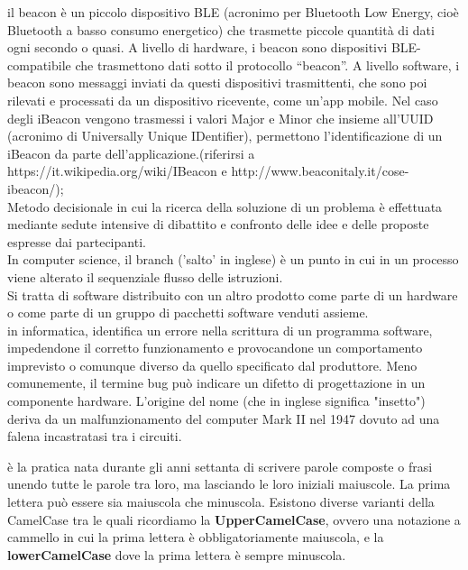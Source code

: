 \documentclass{scalatekids-article}
\begin{document}
 il beacon è un piccolo dispositivo BLE (acronimo per Bluetooth Low Energy, cioè Bluetooth a basso consumo energetico) che trasmette piccole quantità di dati ogni secondo o quasi.  A livello di hardware, i beacon sono dispositivi BLE-compatibile che trasmettono dati sotto il protocollo “beacon”.
A livello software, i beacon sono messaggi inviati da questi dispositivi trasmittenti, che sono poi rilevati e processati da un dispositivo ricevente, come un’app mobile. Nel caso degli iBeacon vengono trasmessi i valori Major e Minor che insieme all’UUID (acronimo di Universally Unique IDentifier), permettono l’identificazione di un iBeacon da parte dell’applicazione.(riferirsi a https://it.wikipedia.org/wiki/IBeacon e http://www.beaconitaly.it/cose-ibeacon/);
\\

 Metodo decisionale in cui la ricerca della soluzione di un problema è effettuata mediante sedute intensive di dibattito e confronto delle idee e delle proposte espresse dai partecipanti.
\\

 In computer science, il branch ('salto' in inglese) è un punto in cui in un processo viene alterato il sequenziale flusso delle istruzioni.
\\

 Si tratta di software distribuito con un altro prodotto come parte di un hardware o come parte di un gruppo di pacchetti software venduti assieme.
\\

 in informatica, identifica un errore nella scrittura di un programma software, impedendone il corretto funzionamento e provocandone un comportamento imprevisto o comunque diverso da quello specificato dal produttore. Meno comunemente, il termine bug può indicare un difetto di progettazione in un componente hardware.
L'origine del nome (che in inglese significa "insetto") deriva da un malfunzionamento del computer Mark II nel 1947 dovuto ad una falena incastratasi tra i circuiti.
\\


 è la pratica nata durante gli anni settanta di scrivere parole composte o frasi unendo tutte le parole tra loro, ma lasciando le loro iniziali maiuscole. La prima lettera può essere sia maiuscola che minuscola.
Esistono diverse varianti della CamelCase tra le quali ricordiamo la \textbf{UpperCamelCase}, ovvero una notazione a cammello in cui la prima lettera è obbligatoriamente maiuscola, e la \textbf{lowerCamelCase} dove la prima lettera è sempre minuscola.
\\
\end{document}
